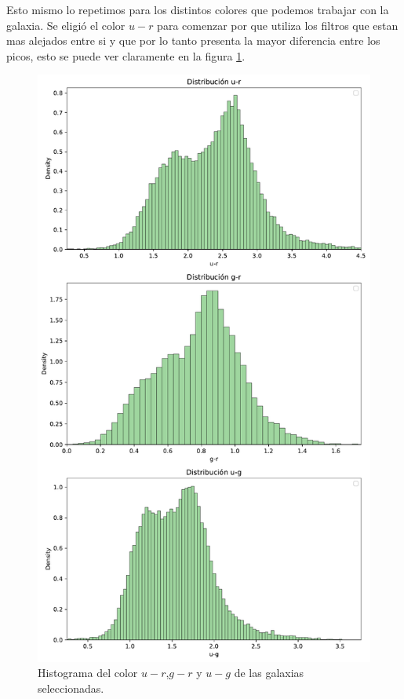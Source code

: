 \documentclass[twocolumn]{article}
\begin{document}
Esto mismo lo repetimos para los distintos colores que podemos trabajar con la galaxia. Se eligió  el color $u-r$ para comenzar por que utiliza los filtros que estan mas alejados entre si y que por lo tanto presenta la mayor diferencia entre los picos, esto se puede ver claramente en la figura \ref{fig:colores}.

\begin{figure}[t]
\includegraphics[width=\linewidth]{rojas_azules_vertical.pdf}
\caption{Histograma del color $u-r$,$g-r$ y $u-g$  de las galaxias seleccionadas.}
\label{fig:colores}
\end{figure}
\end{document}

